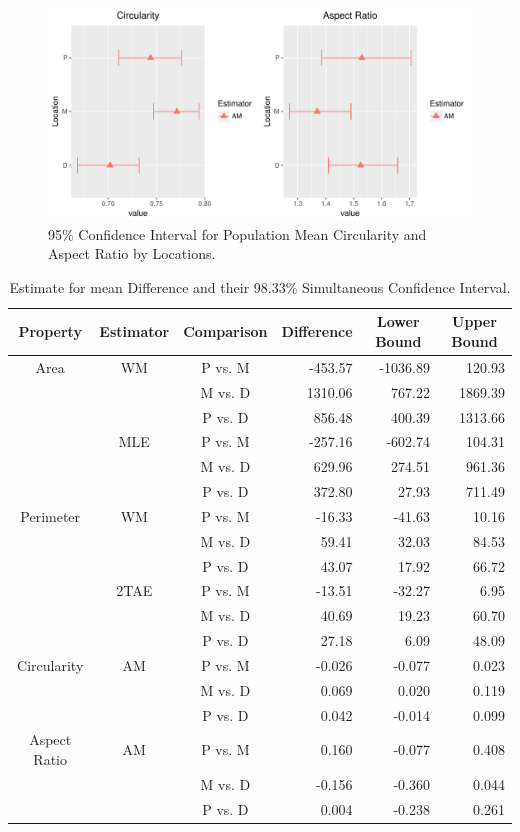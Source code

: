 \documentclass{article}\usepackage[]{graphicx}\usepackage[]{color}
\makeatletter
\def\maxwidth{ %
  \ifdim\Gin@nat@width>\linewidth
    \linewidth
  \else
    \Gin@nat@width
  \fi
}
\newenvironment{knitrout}{}{} %
\numberwithin{figure}{subsection} %
\numberwithin{table}{subsection} %
\makeatother
\begin{document}
\begin{figure}[!htbp]
  \centering
\begin{knitrout}
\color{fgcolor}
\includegraphics[width=\maxwidth]{figure/unnamed-chunk-14-1} 

\end{knitrout}
  \caption{95\% Confidence Interval for Population Mean Circularity and Aspect Ratio by Locations.}
  \label{m_cir_ar}
\end{figure}
\vspace{0.5cm}

\begin{table}[!htbp]
\begin{center}
\begin{tabular}{cccrrr}
\hline\hline
\multicolumn{1}{c}{Property}&\multicolumn{1}{c}{Estimator}&\multicolumn{1}{c}{Comparison}&\multicolumn{1}{c}{Difference}&\multicolumn{1}{c}{Lower Bound}&\multicolumn{1}{c}{Upper Bound}\tabularnewline
\hline

Area&WM&P vs. M&-453.57&-1036.89&120.93\tabularnewline
&&M vs. D&1310.06&767.22&1869.39\tabularnewline
&&P vs. D&856.48&400.39&1313.66\tabularnewline
&MLE&P vs. M&-257.16&-602.74&104.31\tabularnewline
&&M vs. D&629.96&274.51&961.36\tabularnewline
&&P vs. D&372.80&27.93&711.49\tabularnewline
\hline

Perimeter&WM&P vs. M&-16.33&-41.63&10.16\tabularnewline
&&M vs. D&59.41&32.03&84.53\tabularnewline
&&P vs. D&43.07&17.92&66.72\tabularnewline
&2TAE&P vs. M&-13.51&-32.27&6.95\tabularnewline
&&M vs. D&40.69&19.23&60.70\tabularnewline
&&P vs. D&27.18&6.09&48.09\tabularnewline
\hline

Circularity&AM&P vs. M&-0.026&-0.077&0.023\tabularnewline
&&M vs. D&0.069&0.020&0.119\tabularnewline
&&P vs. D&0.042&-0.014&0.099\tabularnewline
\hline

Aspect Ratio&AM&P vs. M&0.160&-0.077&0.408\tabularnewline
&&M vs. D&-0.156&-0.360&0.044\tabularnewline
&&P vs. D&0.004&-0.238&0.261\tabularnewline
\hline
\end{tabular}
\caption{Estimate for mean Difference and their 98.33\% Simultaneous Confidence Interval.\label{tab_ci}}\end{center}
\end{table}
\end{document}
